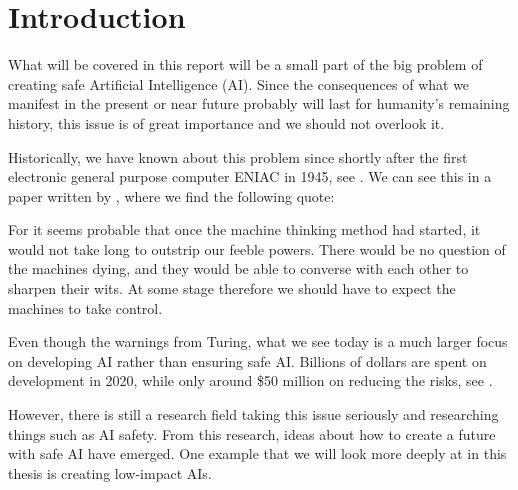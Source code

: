 \documentclass[12pt,A4]{report}
\theoremstyle{definition}
\begin{document}
% 

\chapter{Introduction}
What will be covered in this report will be a small part of the big problem of creating safe Artificial Intelligence (AI). Since the consequences of what we manifest in the present or near future probably will last for humanity's remaining history, this issue is of great importance and we should not overlook it.


Historically, we have known about this problem since shortly after the first electronic general purpose computer ENIAC in 1945, see \citet{wiki:ENIAC}. We can see this in a paper written by \citet{Turing51}, where we find the following quote:

\begin{displayquote}
  For it seems probable that once the machine thinking method had started, it would not take long to outstrip our feeble powers. There would be no question of the machines dying, and they would be able to converse with each other to sharpen their wits. At some stage therefore we should have to expect the machines to take control.
\end{displayquote}

Even though the warnings from Turing, what we see today is a much larger focus on developing AI rather than ensuring safe AI. Billions of dollars are spent on development in 2020, while only around \$50 million on reducing the risks, see \citet{80000}. 

However, there is still a research field taking this issue seriously and researching things such as AI safety. From this research, ideas about how to create a future with safe AI have emerged. One example that we will look more deeply at in this thesis is creating low-impact AIs.
\end{document}
